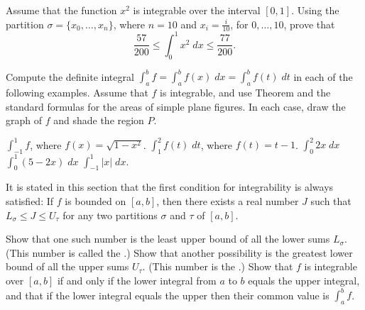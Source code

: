 \begin{exercises}
Assume that the function $x^2$ is integrable over the
interval $[0,1]$.  Using the partition
$\sigma = \{x_0, \ldots, x_n\}$, where $n=10$
and $x_i = \frac{i}{10}$, for $0,\ldots,10$,
prove that
\[
\frac{57}{200} \leq \int_0^1 x^2 \; dx \leq \frac{77}{200}
.
\]

Compute the definite integral
$\int_a^b f = \int_a^b f(x) \; dx = \int_a^b f(t) \; dt$
in each of the following examples.
Assume that $f$ is integrable, and use
Theorem  and the standard formulas
for the areas of simple plane figures.
In each case,
draw the graph of $f$ and shade the region $P$.
\begin{exenum}
\x
$\int_{-1}^1 f$, where $f(x) = \sqrt{1-x^2}$.
\x
$\int_1^2 f(t) \; dt$, where $f(t) = t-1$.
\x
$\int_0^2 2x \; dx$
\x
$\int_0^1 (5-2x) \; dx$
\x
$\int_{-1}^1 |x| \; dx$.
\end{exenum}

It is stated in this section that the first condition for
integrability is always satisfied:
If $f$ is bounded on $[a,b]$, then there exists a real
number $J$ such that $L_\sigma \leq J \leq U_\tau$
for any two partitions $\sigma$ and $\tau$ of $[a,b]$.
\begin{exenum}
\x
Show that one such number is the least upper bound
of all the lower sums $L_\sigma$.
(This number is called the .)
\x
Show that another possibility is the greatest lower bound
of all the upper sums $U_\tau$.
(This number is the .)
\x
Show that $f$ is integrable over $[a,b]$ if and only
if the lower integral from $a$ to $b$ equals the upper integral,
and that if the lower integral equals the upper then their
common value is $\int_a^b f$.
\end{exenum}

\end{exercises}
